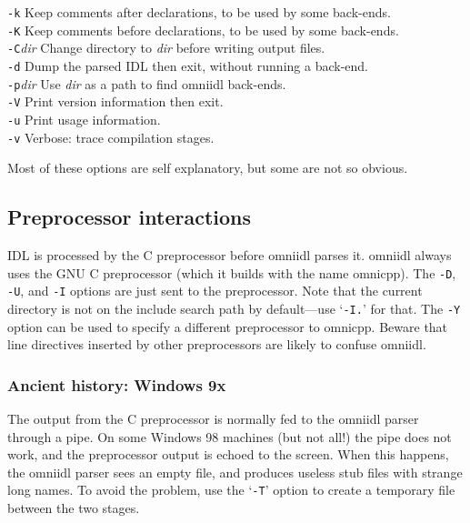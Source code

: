 \documentclass[11pt,oneside,a4paper]{book}
\newcommand{\cmdline}[1]{\texttt{#1}}
\begin{document}
\begin{tabbing}
\cmdline{-k}
     \> Keep comments after declarations, to be used by some back-ends.\\

\cmdline{-K}
     \> Keep comments before declarations, to be used by some back-ends.\\

\cmdline{-C}\textit{dir}
     \> Change directory to \textit{dir} before writing output files.\\

\cmdline{-d}
     \> Dump the parsed IDL then exit, without running a back-end.\\

\cmdline{-p}\textit{dir}
     \> Use \textit{dir} as a path to find omniidl back-ends.\\

\cmdline{-V}
     \> Print version information then exit.\\

\cmdline{-u}
     \> Print usage information.\\

\cmdline{-v}
     \> Verbose: trace compilation stages.\\

\end{tabbing}

\noindent Most of these options are self explanatory, but some are not
so obvious.

\subsection{Preprocessor interactions}

IDL is processed by the C preprocessor before omniidl parses it.
omniidl always uses the GNU C preprocessor (which it builds with the
name omnicpp). The \cmdline{-D}, \cmdline{-U}, and \cmdline{-I}
options are just sent to the preprocessor. Note that the current
directory is not on the include search path by default---use
`\cmdline{-I.}' for that. The \cmdline{-Y} option can be used to
specify a different preprocessor to omnicpp. Beware that line
directives inserted by other preprocessors are likely to confuse
omniidl.

\subsubsection{Ancient history: Windows 9x}

The output from the C preprocessor is normally fed to the omniidl
parser through a pipe. On some Windows 98 machines (but not all!)  the
pipe does not work, and the preprocessor output is echoed to the
screen. When this happens, the omniidl parser sees an empty file, and
produces useless stub files with strange long names. To avoid the
problem, use the `\cmdline{-T}' option to create a temporary file
between the two stages.
\end{document}
